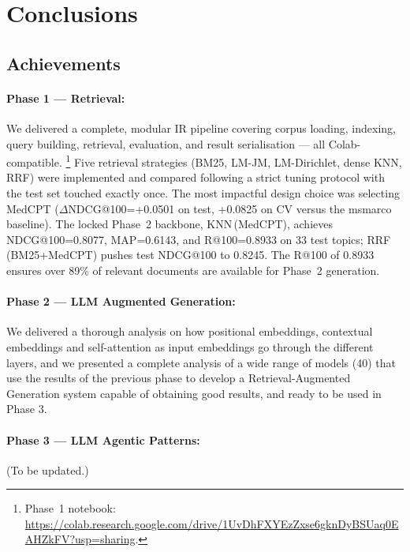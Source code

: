 
\section{Conclusions}
\label{sec:conclusions}

\subsection{Achievements}
\label{sec:achievements}

\paragraph{Phase 1 --- Retrieval:}
We delivered a complete, modular IR pipeline covering corpus loading,
indexing, query building, retrieval, evaluation, and result serialisation ---
all Colab-compatible.%
\footnote{Phase~1 notebook:
\url{https://colab.research.google.com/drive/1UvDhFXYEzZxse6gknDyBSUaq0EAHZkFV?usp=sharing}.}
Five retrieval strategies (BM25, LM-JM, LM-Dirichlet, dense KNN, RRF)
were implemented and compared following a strict tuning protocol with the
test set touched exactly once.
The most impactful design choice was selecting MedCPT
($\Delta$NDCG@100=+0.0501 on test, +0.0825 on CV versus the msmarco
baseline).
The locked Phase~2 backbone, KNN\,(MedCPT), achieves NDCG@100=0.8077,
MAP=0.6143, and R@100=0.8933 on 33 test topics; RRF (BM25+MedCPT)
pushes test NDCG@100 to 0.8245.
The R@100 of 0.8933 ensures over 89\% of relevant documents are available
for Phase~2 generation.

\paragraph{Phase 2 --- LLM Augmented Generation:}
We delivered a thorough analysis on how positional embeddings, contextual embeddings and self-attention as input embeddings go through the different layers, and we presented a complete analysis of a wide range of models (40) that use the results of the previous phase to develop a Retrieval-Augmented Generation system capable of obtaining good results, and ready to be used in Phase 3.

\paragraph{Phase 3 --- LLM Agentic Patterns:} (To be updated.)

